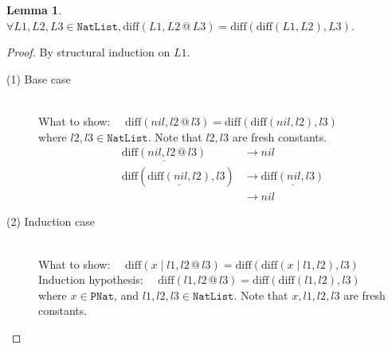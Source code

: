 \documentclass[12pt, a4paper]{article}
\newtheorem{lemma}[theorem]{Lemma}
\newcommand{\rel}[1]{\mathrel{#1}}
\newcommand{\rmx}[1]{\mathrm{#1}}
\newcommand{\larrow}{\longrightarrow}
\newcommand{\under}{\underline}
\begin{document}
\begin{lemma}
\label{lm1}
$\forall L1, L2, L3 \in \mathtt{NatList}, \rmx{diff}(L1, L2 \rel{@} L3) = \rmx{diff}(\rmx{diff}(L1, L2), L3)$.
\end{lemma}
\begin{proof}
By structural induction on $L1$.

\begin{description}

\item[(1) Base case]~\\
\noindent
What to show: $\quad \rmx{diff}(nil, l2 \rel{@} l3) = \rmx{diff}(\rmx{diff}(nil, l2), l3)$ \\
where $l2, l3 \in \mathtt{NatList}$.
Note that $l2, l3$ are fresh constants.
\begin{align*}
\under{\rmx{diff}(nil, l2 \rel{@} l3)}
	&\larrow nil \tag{by diff1} \\
\rmx{diff}(\under{\rmx{diff}(nil, l2)}, l3)
	&\larrow \under{\rmx{diff}(nil, l3)} \tag{by diff1} \\
	&\larrow nil \tag{by diff1}
\end{align*}

\item[(2) Induction case]~\\
What to show: $\quad \rmx{diff}(x \rel{|} l1, l2 \rel{@} l3) = \rmx{diff}(\rmx{diff}(x \rel{|} l1, l2), l3)$ \\
Induction hypothesis: $\quad \rmx{diff}(l1, l2 \rel{@} l3) = \rmx{diff}(\rmx{diff}(l1, l2), l3)$  \\
where $x\in \mathtt{PNat}$, and $l1, l2, l3 \in \mathtt{NatList}$.
Note that $x, l1, l2, l3$ are fresh constants.


\end{description}
\end{proof}
\end{document}

